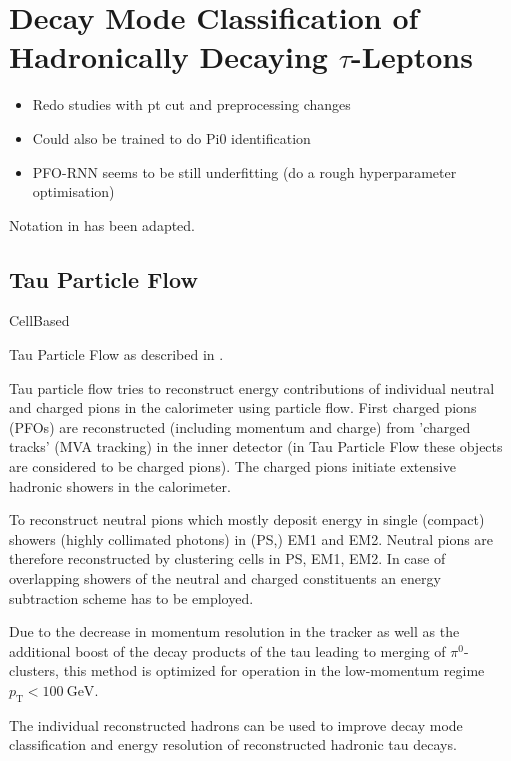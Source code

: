 \chapter{Decay Mode Classification of Hadronically Decaying $\tau$-Leptons}
\label{sec:decaymode}

\begin{itemize}
\item Redo studies with pt cut and preprocessing changes
\item Could also be trained to do Pi0 identification
\item PFO-RNN seems to be still underfitting (do a rough hyperparameter
  optimisation)
\end{itemize}

Notation in \cite{atlas:taurec:decaymodes} has been adapted.

\section{Tau Particle Flow}
\label{sec:tau_pflow}

CellBased \cite{bwinter}

Tau Particle Flow as described in \cite{atlas:taurec:decaymodes}.

Tau particle flow tries to reconstruct energy contributions of individual
neutral and charged pions in the calorimeter using particle flow. First charged
pions (PFOs) are reconstructed (including momentum and charge) from 'charged
tracks' (MVA tracking) in the inner detector (in Tau Particle Flow these objects
are considered to be charged pions). The charged pions initiate extensive
hadronic showers in the calorimeter.

To reconstruct neutral pions which mostly deposit energy in single (compact)
showers (highly collimated photons) in (PS,) EM1 and EM2. Neutral pions are
therefore reconstructed by clustering cells in PS, EM1, EM2. In case of
overlapping showers of the neutral and charged constituents an energy
subtraction scheme has to be employed.

Due to the decrease in momentum resolution in the tracker as well as the
additional boost of the decay products of the tau leading to merging of
$\pi^0$-clusters, this method is optimized for operation in the low-momentum
regime $p_\text{T} < \SI{100}{\giga\electronvolt}$.

The individual reconstructed hadrons can be used to improve decay mode
classification and energy resolution of reconstructed hadronic tau decays.


